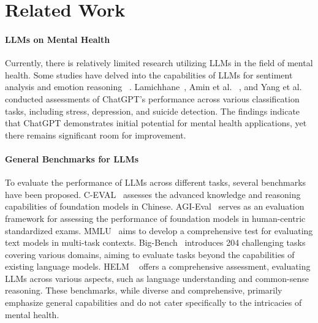 
\section{Related Work}
\paragraph*{LLMs on Mental Health}
Currently, there is relatively limited research utilizing LLMs in the field of mental health. Some studies have delved into the capabilities of LLMs for sentiment analysis and emotion reasoning ~\citep{kocon2023chatgpt, qin2023chatgpt, zhong2023can}. Lamichhane~\citep{Lamichhane2023chatgptapp}, Amin et al. ~\citep{amin2023will}, and Yang et al.~\citep{yang2023evaluations} conducted assessments of ChatGPT's performance across various classification tasks, including stress, depression, and suicide detection. The findings indicate that ChatGPT demonstrates initial potential for mental health applications, yet there remains significant room for improvement.

\paragraph*{General Benchmarks for LLMs}
To evaluate the performance of LLMs across different tasks, several benchmarks have been proposed. C-EVAL~\citep{huang2023ceval} assesses the advanced knowledge and reasoning capabilities of foundation models in Chinese. AGI-Eval~\citep{zhong2023agieval} serves as an evaluation framework for assessing the performance of foundation models in human-centric standardized exams. MMLU~\citep{hendrycks2021measuring} aims to develop a comprehensive test for evaluating text models in multi-task contexts. Big-Bench~\citep{srivastava2023beyond} introduces 204 challenging tasks covering various domains, aiming to evaluate tasks beyond the capabilities of existing language models. HELM ~\citep{helm2023liang} offers a comprehensive assessment, evaluating LLMs across various aspects, such as language understanding and common-sense reasoning. 
These benchmarks, while diverse and comprehensive, primarily emphasize general capabilities and do not cater specifically to the intricacies of mental health.

